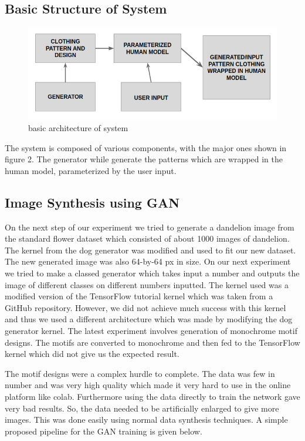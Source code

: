 \documentclass{article}
\begin{document}
    \subsection{Basic Structure of System}
        \begin{figure}[h]
            \centering
            \includegraphics[scale=0.75]{images/basicArchitecture.png}
            \caption{basic architecture of system}
        \end{figure}
    The system is composed of various components, with the major ones shown in figure 2. The generator while generate the patterns which are wrapped in the human model, parameterized by the user input.
    
    \subsection{Image Synthesis using GAN}
    
       On the next step of our experiment we tried to generate a dandelion image from the standard flower dataset which consisted of about 1000 images of dandelion. The kernel from the dog generator was modified and used to fit our new dataset. The new generated image was also 64-by-64 px in size.
    On our next experiment we tried to make a classed generator which takes input a number and outputs the image of different classes on different numbers inputted. The kernel used was a modified version of the TensorFlow tutorial kernel which was taken from a GitHub repository. However, we did not achieve much success with this kernel and thus we used a different architecture which was made by modifying the dog generator kernel.
    The latest experiment involves generation of monochrome motif designs. The motifs are converted to monochrome and then fed to the TensorFlow kernel which did not give us the expected result.
    
    The motif designs were a complex hurdle to complete. The data was few in number and was very high quality which made it very hard to use in the online platform like colab. Furthermore using the data directly to train the network gave very bad results. So, the data needed to be artificially enlarged to give more images. This was done easily using normal data synthesis techniques. A simple proposed pipeline for the GAN training is given below.
    
\end{document}
